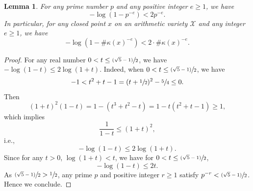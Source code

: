 \documentclass[11pt]{article}
\newcommand{\ie}{i.e.,\xspace}
\numberwithin{equation}{section}
\newcommand{\psfrac}[2]{\sfrac{(#1)}{#2}}
\theoremstyle{plain}
\newtheorem{lem}[thm]{Lemma}
\theoremstyle{definition}
\newcommand{\X}{\mathcal{X}}
\begin{document}
\begin{lem}\label{boundlog}
For any prime number $p$ and any positive integer $e\geq 1$, we have
\[
- \log(1-p^{-e})<2p^{-e}.
\]
In particular, for any closed point $x$ on an arithmetic variety $\X$ and any integer $e\geq 1$, we have
\[
- \log(1-\#\kappa(x)^{-e})<2\cdot\#\kappa(x)^{-e}.
\]
\end{lem}
\begin{proof}
For any real number $0<t\leq \psfrac{\sqrt{5}-1}{2}$, we have $-\log(1-t)\leq 2\log(1+t)$. Indeed, when $0<t\leq \psfrac{\sqrt{5}-1}{2}$, we have
\[
-1<t^2+t-1=(t+\sfrac{1}{2})^2-\sfrac{5}{4}\leq 0.
\]
Then
\[
(1+t)^2(1-t)=1-(t^3+t^2-t)=1-t(t^2+t-1)\geq 1,
\]
which implies
\[
\frac{1}{1-t}\leq (1+t)^2,
\]
\ie
\[
-\log(1-t)\leq 2\log(1+t).
\]
Since for any $t>0$, $\log(1+t)<t$, we have for $0<t\leq \psfrac{\sqrt{5}-1}{2}$,
\[
-\log(1-t)\leq 2t.
\]
As $\psfrac{\sqrt{5}-1}{2}>\sfrac{1}{2}$, any prime $p$ and positive integer $r\geq 1$ satisfy $p^{-r}< \psfrac{\sqrt{5}-1}{2}$. Hence we conclude.
\end{proof}
\end{document}

